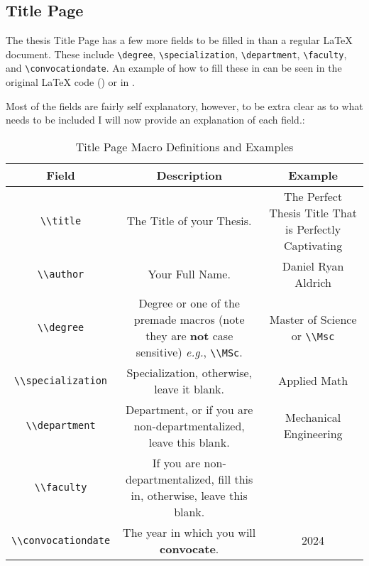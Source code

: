 		\subsection{Title Page}
			The thesis Title Page has a few more fields to be filled in than a regular \LaTeX{} document.
			These include \lstinline|\degree|, \lstinline|\specialization|, \lstinline|\department|, \lstinline|\faculty|, and \lstinline|\convocationdate|.
			An example of how to fill these in can be seen in the original \LaTeX{} code () or in .

			Most of the fields are fairly self explanatory, however, to be extra clear as to what needs to be included I will now provide an explanation of each field.:

			\begin{table}[H]
			\caption{Title Page Macro Definitions and Examples}
			\label{tab:titlePage}
			\begin{tabularx}{0.9\textwidth}{cCC}
				\toprule
					\textbf{Field} & \textbf{Description} & \textbf{Example}\\
				\midrule
					\lstinline|\\title|  & The Title of your Thesis. & The Perfect Thesis Title That is Perfectly Captivating\\
					\lstinline|\\author| & Your Full Name. & Daniel Ryan Aldrich\\
					\lstinline|\\degree| & Degree or one of the premade macros (note they are \textbf{not} case sensitive) \textit{e.g.}, \lstinline|\\MSc|. & Master of Science or \lstinline|\\Msc|\\
					\lstinline|\\specialization| & Specialization, otherwise, leave it blank. & Applied Math\\
					\lstinline|\\department| & Department, or if you are non-departmentalized, leave this blank. & Mechanical Engineering\\
					\lstinline|\\faculty| & If you are non-departmentalized, fill this in, otherwise, leave this blank. & \\
					\lstinline|\\convocationdate| & The year in which you will \textbf{convocate}. & 2024\\
				\bottomrule
			\end{tabularx}
			\end{table}

